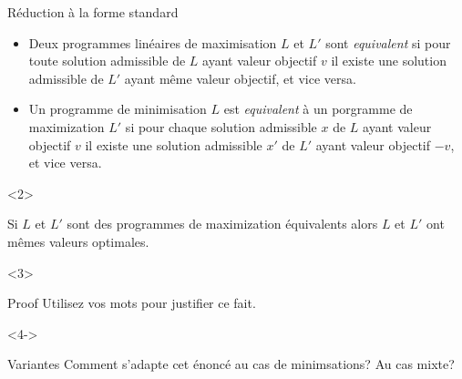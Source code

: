 \documentclass[aspectratio = 169]{beamer}
\begin{document}
\begin{frame}{R\'eduction \`a la forme standard}
  \begin{defn}
    \begin{itemize}
    \item[\textbullet]
      Deux programmes lin\'eaires de maximisation $L$ et $L'$ sont
      \emph{equivalent} si pour toute solution admissible  de $L$
      ayant valeur objectif $v$ il existe une solution admissible de
      $L'$ ayant m\^eme valeur objectif, et vice versa.
    \item[\textbullet]
      Un programme de minimisation $L$ est \emph{equivalent} \`a un
      porgramme de maximization $L'$ si pour chaque solution
      admissible $x$ de $L$ ayant valeur objectif $v$ il existe une
      solution admissible $x'$ de $L'$ ayant valeur objectif $-v$, et
      vice versa.
    \end{itemize}
  \end{defn}
  \begin{overlayarea}{\textwidth}{.3\textheight}
    \vspace{-1em}
    \begin{onlyenv}<2>
      \begin{prop}
        Si $L$ et $L'$ sont des programmes de maximization
        \'equivalents alors $L$ et $L'$ ont m\^emes valeurs optimales.
      \end{prop}
    \end{onlyenv}
    \begin{onlyenv}<3>
      \vspace{1em}
      \begin{halfshyblock}{Proof}
        Utilisez vos mots pour justifier ce fait.
      \end{halfshyblock}
    \end{onlyenv}
    \begin{onlyenv}<4->
      \vspace{1em}
      \begin{halfshyblock}{Variantes}
        Comment s'adapte cet \'enonc\'e au cas de minimsations? Au cas mixte?
      \end{halfshyblock}
    \end{onlyenv}
  \end{overlayarea}
\end{frame}
\end{document}
